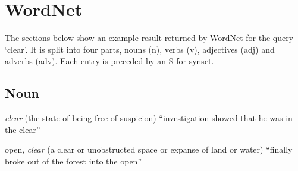 
\chapter{WordNet}
\label{app:wordnet}


The sections below show an example result returned by WordNet for the query `clear'. It is split into four parts, nouns (n), verbs (v), adjectives (adj) and adverbs (adv). Each entry is preceded by an S for synset.


\section{Noun}
\begin{description}[leftmargin=1.5cm]
  \item [S: (n)] \emph{clear} (the state of being free of suspicion) ``investigation showed that he was in the clear''
  \item [S: (n)] open, \emph{clear} (a clear or unobstructed space or expanse of land or water) ``finally broke out of the forest into the open''
\end{description}



